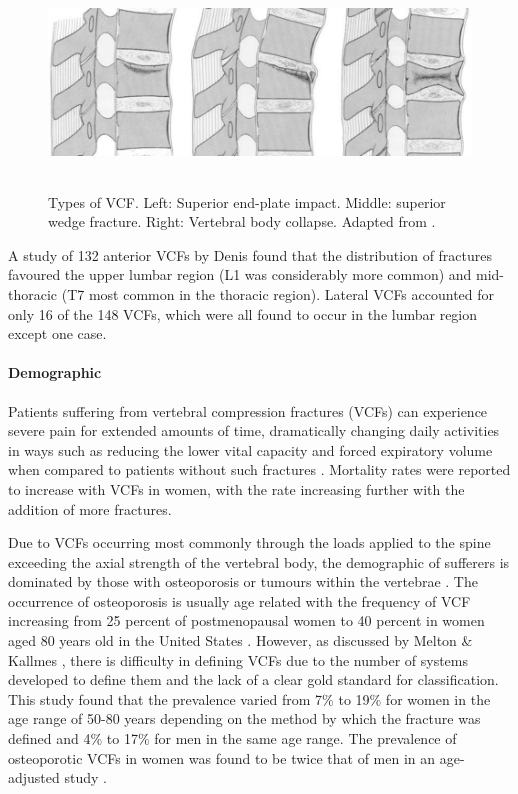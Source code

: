 \begin{figure}[hbt]
\centering
  \includegraphics[width=6.26042in,height=2.20833in]{images/typesOfVCF.png}
  \caption{Types of VCF. Left: Superior end-plate impact. Middle: superior
wedge fracture. Right: Vertebral body collapse. Adapted from
\cite{Magerl1994}.}
\end{figure}





A study of 132 anterior VCFs by Denis \cite{Denis1983} found that the
distribution of fractures favoured the upper lumbar region (L1 was
considerably more common) and mid-thoracic (T7 most common in the
thoracic region). Lateral VCFs accounted for only 16 of the 148 VCFs,
which were all found to occur in the lumbar region except one case.

\paragraph{Demographic}

Patients suffering from vertebral compression fractures (VCFs) can
experience severe pain for extended amounts of time, dramatically
changing daily activities in ways such as reducing the lower vital
capacity and forced expiratory volume when compared to patients without
such fractures \cite{Mathis2001}. Mortality rates were reported to increase
with
VCFs in women, with the rate increasing further with the addition of
more fractures.

Due to VCFs occurring most commonly through the loads applied to the
spine exceeding the axial strength of the vertebral body, the
demographic of sufferers is dominated by those with osteoporosis or
tumours within the vertebrae \cite{Mathis2001}. The occurrence of osteoporosis
is
usually age related with the frequency of VCF increasing from 25 percent
of postmenopausal women to 40 percent in women aged 80 years old in the
United States \cite{Studies2006}. However, as discussed by Melton \& Kallmes
\cite{MeltonIII2006}, there is difficulty in defining VCFs due to the number
of
systems developed to define them and the lack of a clear gold
standard for classification. This study found that the prevalence varied from 7\% to 19\%
for women in the age range of 50-80 years depending on the method by
which the fracture was defined and 4\% to 17\% for men in the same age
range. The prevalence of osteoporotic VCFs in women was found to be
twice that of men in an age-adjusted study \cite{Cooper1992}.

